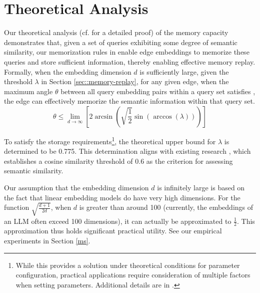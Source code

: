 \section{Theoretical Analysis}
\label{sec:theoretical-analysis}
Our theoretical analysis (cf. \textbf{} for a detailed proof) of the memory capacity demonstrates that, given a set of queries exhibiting some degree of semantic similarity, our memorization rules in  enable edge embeddings to memorize these queries and store sufficient information, thereby enabling effective memory replay. Formally, when the embedding dimension $d$ is sufficiently large, given the threshold $\lambda$ in Section \ref{sec::memory-replay}, for any given edge, when the maximum angle $\theta$ between all query embedding pairs within a query set satisfies , the edge can effectively memorize the semantic information within that query set. 
\begin{equation}
    \theta \leq \lim_{d \to \infty} \left[ 2\arcsin\left(\sqrt{\frac{1}{2}}\sin(\arccos(\lambda))\right) \right]
\label{eq:lamba-theta}
\end{equation}



\begin{remark}
    To satisfy the storage requirements\footnote{While this provides a solution under theoretical conditions for parameter configuration, practical applications require consideration of multiple factors when setting parameters. Additional details are in .}, the theoretical upper bound for $\lambda$ is determined to be 0.775. This determination aligns with existing research \cite{Base1}, which establishes a cosine similarity threshold of 0.6 as the criterion for assessing semantic similarity.
\end{remark}

\begin{remark}
Our assumption that the embedding dimension $d$ is infinitely large is based on the fact that linear embedding models do have very high dimensions. For the function $\sqrt{\frac{d+1}{2d}}$, when $d$ is greater than around 100 (currently, the embeddings of an LLM often exceed 100 dimensions), it can actually be approximated to $\frac{1}{2}$. This approximation thus holds significant practical utility. See our empirical experiments in Section \ref{ms}.
\end{remark}